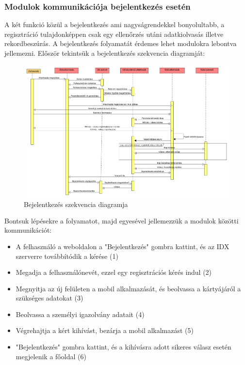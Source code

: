 \subsubsection{Modulok kommunikációja bejelentkezés esetén}
A két funkció közül a bejelentkezés ami nagyságrendekkel bonyolultabb, a regisztráció tulajdonképpen csak egy ellenőrzés utáni adatkiolvasás illetve rekordbeszúrás. A bejelentkezés folyamatát érdemes lehet modulokra lebontva jellemezni.
Először tekintsük a bejelentkezés szekvencia diagramját:

\begin{figure}
\centering
         \includegraphics[scale=0.47]{img/szekvencia}
    \caption{Bejelentkezés szekvencia diagramja}
\end{figure}


\newpage
Bontsuk lépésekre a folyamatot, majd egyesével jellemezzük a modulok közötti kommunikációt:
\begin{itemize}
\item A felhasználó a weboldalon a "Bejelentkezés" gombra kattint, és az IDX szerverre továbbítódik a kérése (1)
\item Megadja a felhasználónevét, ezzel egy regisztrációs kérés indul (2)
\item Megnyitja az új felületen a mobil alkalmazását, és beolvassa a kártyájáról a szükséges adatokat (3)
\item Beolvassa a személyi igazolvány adatait (4)
\item Végrehajtja a kért kihívást, bezárja a mobil alkalmazást  (5)
\item "Bejelentkezés" gombra kattint, és a kihívásra adott sikeres válasz esetén megjelenik a főoldal (6)
\end{itemize}


